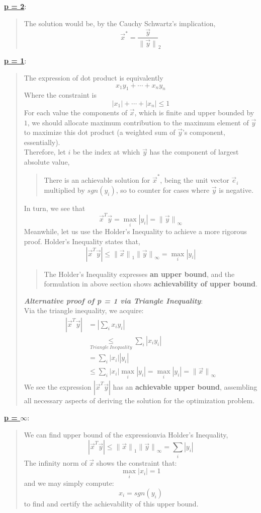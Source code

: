 \underline{\textbf{p = 2}}:
\begin{quote}
    The solution would be, by the Cauchy Schwartz's implication,
    \[\vec{x}^* = \frac{\vec{y}}{\lVert \vec{y} \rVert}_2\]
\end{quote}
\underline{\textbf{p = 1}}:
\begin{quote}
    The expression of dot product is equivalently
    \[x_1 y_1 + \cdots + x_n y_n\]
    Where the constraint is
    \[|x_1| + \cdots + |x_n| \leq 1\]
    For each value the components of $\vec{x}$, which is finite and upper bounded by $1$, we should allocate maximum contribution to the maximum element of $\vec{y}$ to maximize this dot product (a weighted sum of $\vec{y}$'s component, essentially). \\
    Therefore, let $i$ be the index at which $\vec{y}$ has the component of largest absolute value,
    \begin{quote}
        There is an achievable solution for $\vec{x}^*$, being the unit vector $\vec{e}_i$ multiplied by $sgn(y_i)$, so to counter for cases where $\vec{y}$ is negative.
    \end{quote}
    \par
    In turn, we see that
    \[\vec{x}^T \vec{y} = \max_i |y_i| = {\lVert \vec{y} \rVert}_\infty\]
    Meanwhile, let us use the Holder's Inequality to achieve a more rigorous proof. Holder's Inequality states that,
    \[
        |\vec{x}^T \vec{y}| \leq {\lVert \vec{x} \rVert}_1 {\lVert \vec{y} \rVert}_\infty = \max_i |y_i|
    \]
    \begin{quote}
        The Holder's Inequality expresses \textbf{an upper bound}, and the formulation in above section shows \textbf{achievability of upper bound}.
    \end{quote}
    \textbf{\textit{Alternative proof of p = 1 via Triangle Inequality}}: \\
    Via the triangle inequality, we acquire:
    \begin{align*}
        |\vec{x}^T \vec{y}| &= |\sum_i x_i y_i| \\
        &\underset{Triangle\ Inequality}{\leq} \sum_i |x_i y_i| \\
        &= \sum_i |x_i||y_i| \\
        &\leq \sum_i |x_i| \max_i |y_i| = \max_i |y_i| = {\lVert \vec{x} \rVert}_\infty
    \end{align*}
    We see the expression $|\vec{x}^T \vec{y}|$ has an \textbf{achievable upper bound}, assembling all necessary aspects of deriving the solution for the optimization problem.
\end{quote}
\underline{\textbf{p = $\infty$}}:
\begin{quote}
    We can find upper bound of the expressionvia Holder's Inequality,
    \[
        |\vec{x}^T \vec{y}| \leq {\lVert \vec{x} \rVert}_1 {\lVert \vec{y} \rVert}_\infty = \sum_i |y_i|
    \]
    The infinity norm of $\vec{x}$ shows the constraint that:
    \[
        \max_i |x_i| = 1
    \]
    and we may simply compute:
    \[
        x_i = sgn(y_i)
    \]
    to find and certify the achievability of this upper bound.
\end{quote}


